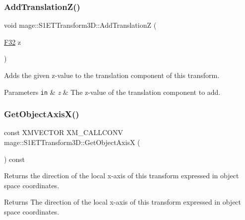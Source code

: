 \subsubsection{\texorpdfstring{Add\+Translation\+Z()}{AddTranslationZ()}}
{\footnotesize\ttfamily void mage\+::\+S1\+E\+T\+Transform3\+D\+::\+Add\+TranslationZ (\begin{DoxyParamCaption}\item[{\mbox{\hyperlink{namespacemage_aa97e833b45f06d60a0a9c4fc22ae02c0}{F32}}}]{z }\end{DoxyParamCaption})\hspace{0.3cm}{\ttfamily [noexcept]}}

Adds the given z-\/value to the translation component of this transform.


\begin{DoxyParams}[1]{Parameters}
\mbox{\tt in}  & {\em z} & The z-\/value of the translation component to add. \\
\hline
\end{DoxyParams}
\mbox{\label{classmage_1_1_s1_e_t_transform3_d_af55ca75f9b573da16a88951616f1e9ab}} 
\subsubsection{\texorpdfstring{Get\+Object\+Axis\+X()}{GetObjectAxisX()}}
{\footnotesize\ttfamily const X\+M\+V\+E\+C\+T\+OR X\+M\+\_\+\+C\+A\+L\+L\+C\+O\+NV mage\+::\+S1\+E\+T\+Transform3\+D\+::\+Get\+Object\+AxisX (\begin{DoxyParamCaption}{ }\end{DoxyParamCaption}) const\hspace{0.3cm}{\ttfamily [noexcept]}}

Returns the direction of the local x-\/axis of this transform expressed in object space coordinates.

\begin{DoxyReturn}{Returns}
The direction of the local x-\/axis of this transform expressed in object space coordinates. 
\end{DoxyReturn}
\mbox{\label{classmage_1_1_s1_e_t_transform3_d_ad9cfdad18af96c0309461d173dbb4f8b}} 
